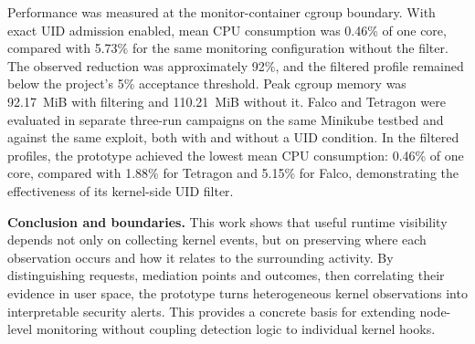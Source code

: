 Performance was measured at the monitor-container cgroup boundary. With exact
UID admission enabled, mean CPU consumption was 0.46\% of one core, compared
with 5.73\% for the same monitoring configuration without the filter. The
observed reduction was approximately 92\%, and the filtered profile remained
below the project's 5\% acceptance threshold. Peak cgroup memory was
92.17~MiB with filtering and 110.21~MiB without it. Falco and Tetragon 
were evaluated in separate three-run campaigns on the same
Minikube testbed and against the same exploit, both with and without a UID
condition. In the filtered profiles, the prototype achieved the lowest mean CPU
consumption: 0.46\% of one core, compared with 1.88\% for Tetragon and 5.15\%
for Falco, demonstrating the effectiveness of its kernel-side UID filter.

\medskip
\noindent\textbf{Conclusion and boundaries.}
This work shows that useful runtime visibility depends not only on collecting
kernel events, but on preserving where each observation occurs and how it
relates to the surrounding activity. By distinguishing requests, mediation
points and outcomes, then correlating their evidence in user space, the
prototype turns heterogeneous kernel observations into interpretable security
alerts. This provides a concrete basis for extending node-level monitoring
without coupling detection logic to individual kernel hooks.
